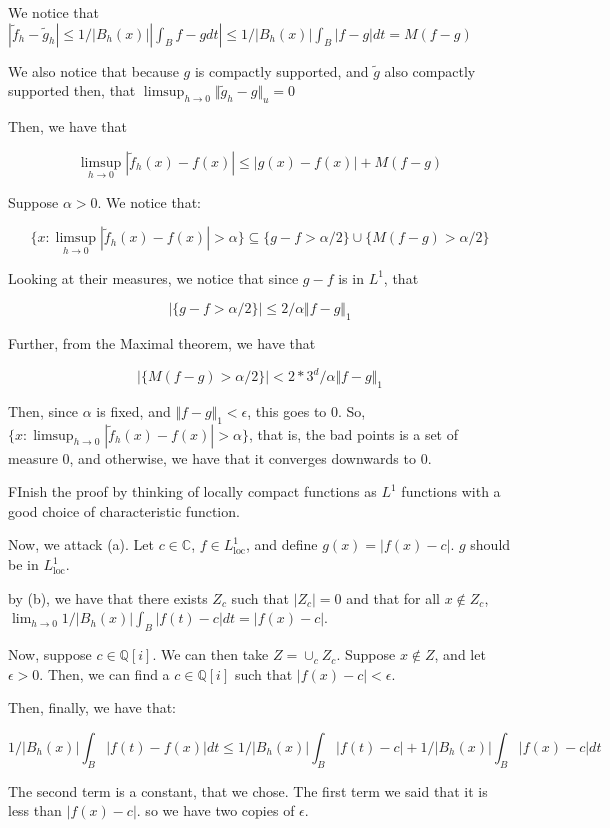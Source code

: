 \documentclass[10pt]{article}
\begin{document}
We notice that $| \tilde{f}_h - \tilde{g}_h | \leq 1/|B_h(x)| | \int_{B} f - g dt  | \leq  1/|B_h(x)| \int_{B} |f - g| dt = M(f-g)$

We also notice that because $g$ is compactly supported, and $\tilde{g}$ also compactly supported then, that $ \limsup_{h \to 0} \Vert \tilde{g}_h - g \Vert_u = 0$

Then, we have that

$$ \limsup_{h \to 0} |\tilde{f}_h(x) - f(x)|  \leq |g(x) - f(x)| + M(f - g) $$

Suppose $\alpha > 0$. We notice that:

$$ \{ x : \limsup_{h \to 0} |\tilde{f}_h(x) - f(x)| > \alpha \} \subseteq \{ g - f > \alpha/2 \} \cup \{ M(f-g) > \alpha/2 \} $$

Looking at their measures, we notice that since $g-f$ is in $L^1$, that 

$$|\{ g - f > \alpha/2 \}| \leq 2/\alpha \Vert f -g \Vert_1$$

Further, from the Maximal theorem, we have that

$$ | \{ M(f-g) > \alpha/2 \}| < 2 * 3^d/\alpha \Vert f - g \Vert_1 $$

Then, since $\alpha$ is fixed, and $ \Vert f - g \Vert _1 < \epsilon$, this goes to 0. So, $\{ x : \limsup_{h \to 0} |\tilde{f}_h(x) - f(x)| > \alpha \}$, that is, the bad points is a set of measure 0, and otherwise, we have that it converges downwards to $0$.

FInish the proof by thinking of locally compact functions as $L^1$ functions with a good choice of characteristic function.

Now, we attack (a). Let $c \in \mathbb{C}$, $f \in L^1_{\text{loc}}$, and define $g(x) = | f(x) -c|$. $g$ should be in $L^1_{\text{loc}}$.

by (b), we have that there exists $Z_c$ such that $|Z_c| = 0$ and that for all $x \not \in Z_c$, $\lim_{h \to 0} 1/|B_h(x)| \int_B |f(t) - c| dt = |f(x) - c|$.

Now, suppose $c \in \mathbb{Q}[i]$. We can then take $Z = \cup_{c} Z_c$. Suppose $x \not \in Z$, and let $\epsilon > 0$. Then, we can find a $c \in \mathbb{Q}[i]$ such that $|f(x) - c| < \epsilon$.

Then, finally, we have that:

$$ 1/|B_h(x)| \int_B | f(t) - f(x)| dt \leq  1/|B_h(x)| \int_B |f(t) - c| + 1/|B_h(x)| \int_B |f(x) - c| dt$$

The second term is a constant, that we chose. The first term we said that it is less than $|f(x) -c|$. so we have two copies of $\epsilon$.
\end{document}
